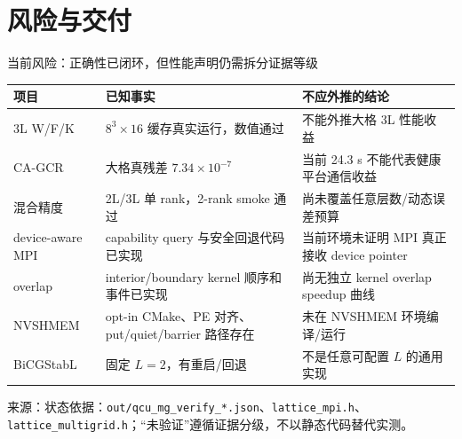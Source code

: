 \documentclass[UTF8,aspectratio=169,11pt]{ctexbeamer}
\newcommand{\source}[1]{%
  \vspace{0.06em}\par{\raggedright\scriptsize\color{muted}来源：#1\par}}
\newcommand{\code}[1]{\nolinkurl{#1}}
\begin{document}
\section{风险与交付}

\begin{frame}[t]{当前风险：正确性已闭环，但性能声明仍需拆分证据等级}
  \begin{center}
    \small
    \begin{tabular}{@{}P{0.22\textwidth}P{0.36\textwidth}P{0.28\textwidth}@{}}
      \toprule
      项目 & 已知事实 & 不应外推的结论 \\
      \midrule
      3L W/F/K & $8^3\times16$ 缓存真实运行，数值通过 & 不能外推大格 3L 性能收益 \\
      CA-GCR & 大格真残差 $7.34\times10^{-7}$ & 当前 24.3 s 不能代表健康平台通信收益 \\
      混合精度 & 2L/3L 单 rank，2-rank smoke 通过 & 尚未覆盖任意层数/动态误差预算 \\
      device-aware MPI & capability query 与安全回退代码已实现 & 当前环境未证明 MPI 真正接收 device pointer \\
      overlap & interior/boundary kernel 顺序和事件已实现 & 尚无独立 kernel overlap speedup 曲线 \\
      NVSHMEM & opt-in CMake、PE 对齐、put/quiet/barrier 路径存在 & 未在 NVSHMEM 环境编译/运行 \\
      BiCGStabL & 固定 $L=2$，有重启/回退 & 不是任意可配置 $L$ 的通用实现 \\
      \bottomrule
    \end{tabular}
  \end{center}
  \source{状态依据：\code{out/qcu_mg_verify_*.json}、\code{lattice_mpi.h}、\code{lattice_multigrid.h}；“未验证”遵循证据分级，不以静态代码替代实测。}
\end{frame}
\end{document}
